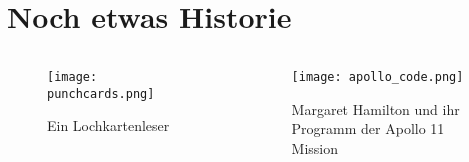 \maketitle

\section{Noch etwas Historie}
\begin{frame}
    \slidehead
    \vspace{3mm}
    \begin{columns}[b]
        \begin{column}{.3\textwidth}
            \begin{figure}
                \centering
                \texttt{[image: punchcards.png]}
                \caption*{Ein Lochkartenleser}
            \end{figure}
        \end{column}%
        \begin{column}{.4\textwidth}
            \centering
            \begin{figure}
                \centering
                \texttt{[image: apollo\_code.png]}
                \caption*{\footnotesize Margaret Hamilton und ihr \\ Programm der Apollo 11 Mission}
            \end{figure}
        \end{column}
    \end{columns}
\end{frame}

